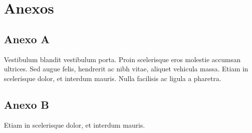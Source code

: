 \chapter*{Anexos}



\section*{Anexo A}

Vestibulum blandit vestibulum porta. Proin scelerisque eros molestie
accumsan ultrices. Sed augue felis, hendrerit ac nibh vitae, aliquet
vehicula massa. Etiam in scelerisque dolor, et interdum mauris. Nulla
facilisis ac ligula a pharetra.

\section*{Anexo B}

Etiam in scelerisque dolor, et interdum mauris.
